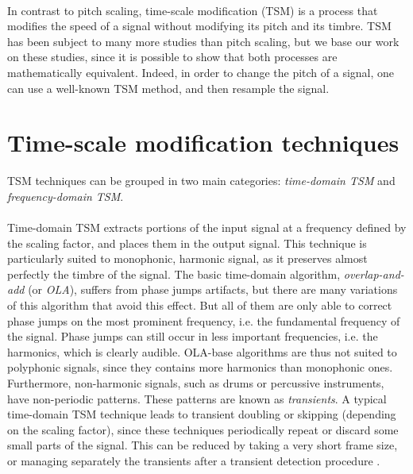 \documentclass[letterpaper]{article}
\begin{document}
\paragraph{}
In contrast to pitch scaling, time-scale modification (TSM) is a process that
modifies the speed of a signal without modifying its pitch and its timbre.
TSM has been subject to many more studies than pitch scaling, but we base our
work on these studies, since it is possible to show that both processes are
mathematically equivalent. Indeed, in order to change the pitch of a signal, one
can use a well-known TSM method, and then resample the signal.

\section{Time-scale modification techniques}
TSM techniques can be grouped in two main categories: \emph{time-domain TSM} and
\emph{frequency-domain TSM}.

\paragraph{}
Time-domain TSM extracts portions of the input signal at a frequency defined by
the scaling factor, and places them in the output signal. This technique is
particularly suited to monophonic, harmonic signal, as it preserves almost
perfectly the timbre of the signal. The basic time-domain algorithm,
\emph{overlap-and-add} (or \emph{OLA}), suffers from phase jumps artifacts, but
there are many variations of this algorithm that avoid this effect. But all of
them are only able to correct phase jumps on the most prominent frequency, i.e.
the fundamental frequency of the signal. Phase jumps can still occur in less
important frequencies, i.e. the harmonics, which is clearly audible. OLA-base
algorithms are thus not suited to polyphonic signals, since they contains more
harmonics than monophonic ones. Furthermore, non-harmonic signals, such as drums
or percussive instruments, have non-periodic patterns. These patterns are known
as \emph{transients}. A typical time-domain TSM technique leads to transient
doubling or skipping (depending on the scaling factor), since these techniques
periodically repeat or discard some small parts of the signal. This can be
reduced by taking a very short frame size, or managing separately the transients
after a transient detection procedure \citep{Grofit2008}.
\end{document}
